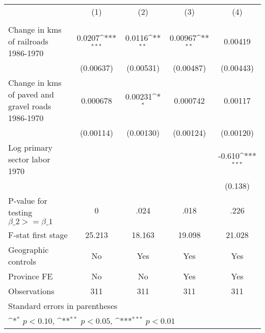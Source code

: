 {
\def\sym#1{\ifmmode^{#1}\else\(^{#1}\)\fi}
\begin{tabular}{l*{4}{c}}
\hline\hline
                &\multicolumn{1}{c}{(1)}&\multicolumn{1}{c}{(2)}&\multicolumn{1}{c}{(3)}&\multicolumn{1}{c}{(4)}\\
                &\multicolumn{1}{c}{}&\multicolumn{1}{c}{}&\multicolumn{1}{c}{}&\multicolumn{1}{c}{}\\
\hline
Change in kms of railroads 1986-1970&   0.0207\sym{***}&   0.0116\sym{**} &  0.00967\sym{**} &  0.00419         \\
                &(0.00637)         &(0.00531)         &(0.00487)         &(0.00443)         \\
[1em]
Change in kms of paved and gravel roads 1986-1970& 0.000678         &  0.00231\sym{*}  & 0.000742         &  0.00117         \\
                &(0.00114)         &(0.00130)         &(0.00124)         &(0.00120)         \\
[1em]
Log primary sector labor 1970&                  &                  &                  &   -0.610\sym{***}\\
                &                  &                  &                  &  (0.138)         \\
\hline
P-value for testing $\beta\_{2} >= \beta\_{1}$&        0         &     .024         &     .018         &     .226         \\
F-stat first stage&   25.213         &   18.163         &   19.098         &   21.028         \\
Geographic controls&       No         &      Yes         &      Yes         &      Yes         \\
Province FE     &       No         &       No         &      Yes         &      Yes         \\
Observations    &      311         &      311         &      311         &      311         \\
\hline\hline
\multicolumn{5}{l}{\footnotesize Standard errors in parentheses}\\
\multicolumn{5}{l}{\footnotesize \sym{*} \(p<0.10\), \sym{**} \(p<0.05\), \sym{***} \(p<0.01\)}\\
\end{tabular}
}

